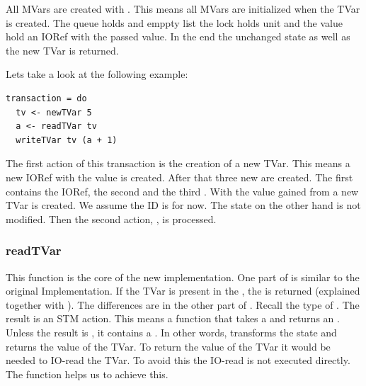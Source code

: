 All MVars are created with . This means all MVars are initialized when the TVar is created.
The queue holds and emppty list the lock holds unit and the value hold an IORef with the passed value.
In the end the unchanged state as well as the new TVar is returned.

Lets take a look at the following example:
\begin{lstlisting}
transaction = do 
  tv <- newTVar 5
  a <- readTVar tv
  writeTVar tv (a + 1)
\end{lstlisting}
The first action of this transaction is the creation of a new TVar. This means a new IORef with 
the value  is created. After that three new  are created. The first contains the 
IORef, the second \code{[]} and the third \code{()}. With the value gained from 
 a new TVar is created. We assume the ID is  for now. 
The state on the other hand is not modified. Then the 
second action, , is processed.


\subsubsection{readTVar}
This function is the core of the new implementation. One part of  is similar to the original 
Implementation. If the TVar is present in the , the  is returned (explained together with ).
The differences are in the other part of . Recall the type of .
The result is an STM action. This means a function that takes a  and returns an . 
Unless the result is , it contains a . In other words,  transforms
the state and returns the value of the TVar. To return the value of the TVar it would be needed to IO-read the
TVar. To avoid this the IO-read is not executed directly. The function  helps us to achieve this.


